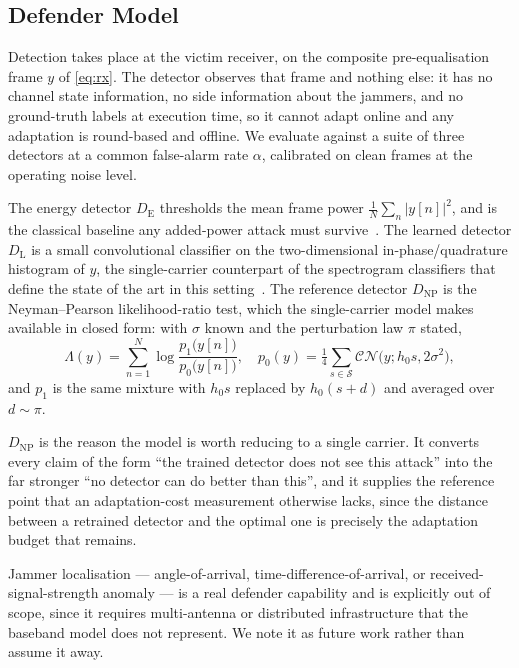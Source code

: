 \subsection{Defender Model}
\label{sec:system:defender}

Detection takes place at the victim receiver, on the composite pre-equalisation frame $y$ of \eqref{eq:rx}.
The detector observes that frame and nothing else: it has no channel state information, no side information about the jammers, and no ground-truth labels at execution time, so it cannot adapt online and any adaptation is round-based and offline.
We evaluate against a suite of three detectors at a common false-alarm rate $\alpha$, calibrated on clean frames at the operating noise level.

The energy detector $D_{\mathrm{E}}$ thresholds the mean frame power $\frac{1}{N}\sum_n |y[n]|^2$, and is the classical baseline any added-power attack must survive~\cite{urkowitz1967energy}.
The learned detector $D_{\mathrm{L}}$ is a small convolutional classifier on the two-dimensional in-phase/quadrature histogram of $y$, the single-carrier counterpart of the spectrogram classifiers that define the state of the art in this setting~\cite{li2022jamming_ofdm}.
The reference detector $D_{\mathrm{NP}}$ is the Neyman--Pearson likelihood-ratio test, which the single-carrier model makes available in closed form: with $\sigma$ known and the perturbation law $\pi$ stated,
\begin{equation}
  \Lambda(y) = \sum_{n=1}^{N} \log \frac{p_1\bigl(y[n]\bigr)}{p_0\bigl(y[n]\bigr)},
  \quad
  p_0(y) = \tfrac{1}{4}\!\sum_{s \in \mathcal{S}}\! \mathcal{CN}\bigl(y; h_0 s, 2\sigma^2\bigr),
  \label{eq:np}
\end{equation}
and $p_1$ is the same mixture with $h_0 s$ replaced by $h_0(s + d)$ and averaged over $d \sim \pi$.

$D_{\mathrm{NP}}$ is the reason the model is worth reducing to a single carrier.
It converts every claim of the form ``the trained detector does not see this attack'' into the far stronger ``no detector can do better than this'', and it supplies the reference point that an adaptation-cost measurement otherwise lacks, since the distance between a retrained detector and the optimal one is precisely the adaptation budget that remains.

Jammer localisation --- angle-of-arrival, time-difference-of-arrival, or received-signal-strength anomaly --- is a real defender capability and is explicitly out of scope, since it requires multi-antenna or distributed infrastructure that the baseband model does not represent.
We note it as future work rather than assume it away.

